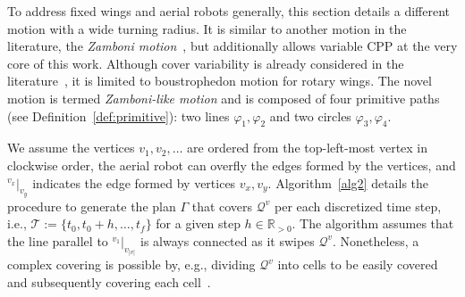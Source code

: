 \documentclass[letterpaper,10pt,journal,twoside]{IEEEtran}
\theoremstyle{definition}
\begin{document}
To address fixed wings and aerial robots generally, this section details a different motion with a wide turning radius. It is similar to another motion in the literature, the \emph{Zamboni motion}~\cite{araujo2013multiple}, but additionally allows variable CPP at the very core of this work. 
{\color{blue} Although cover variability is already considered in the literature~\cite{difranco2015energy}, it is limited to boustrophedon motion for rotary wings.}
The novel motion is termed \emph{Zamboni-like motion} and is composed of four primitive paths (see Definition~\ref{def:primitive}): two lines $\varphi_1,\varphi_2$ and two circles $\varphi_3,\varphi_4$.%

We assume the vertices $v_1,v_2,\dots$ are ordered from the top-left-most vertex in clockwise order, the aerial robot can overfly the edges formed by the vertices, and ${}^{v_x}|_{v_y}$ indicates the edge formed by vertices $v_x,v_y$. 
Algorithm~\ref{alg2} details the procedure to generate the plan $\Gamma$ that covers $\mathcal{Q}^v$ per each discretized time step, i.e., $\mathcal{T}:=\{t_0,t_0+h,\dots,t_f\}$ for a given step $h\in\mathbb{R}_{>0}$. The algorithm assumes that the line parallel to ${}^{v_1}|_{v_{|v|}}$ is always connected as it swipes $\mathcal{Q}^{v}$. Nonetheless, a complex covering is possible by, e.g., dividing $\mathcal{Q}^{v}$ into cells to be easily covered and subsequently covering each cell~\cite{choset2001coverage}.%

\end{document}
